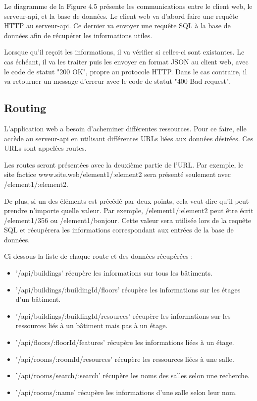 \documentclass[
    iai, %
    il, %
]{heig-tb}
\begin{document}
Le diagramme de la Figure 4.5 présente les communications entre le client web,
le serveur-api, et la base de données. Le client web va d'abord faire une requête HTTP au serveur-api.
Ce dernier va envoyer une requête SQL à la base de données afin de récupérer les informations utiles.

Lorsque qu'il reçoit les informations, il va vérifier si celles-ci sont existantes.
Le cas échéant, il va les traiter puis les envoyer en format JSON au client web, avec le code de statut "200 OK", propre au protocole HTTP.
Dans le cas contraire, il va retourner un message d'erreur avec le code de statut "400 Bad request".

\subsection{Routing}

L'application web a besoin d'acheminer différentes ressources. Pour ce faire, elle accède au serveur-api en utilisant différentes URLs liées aux données désirées.
Ces URLs sont appelées routes.

Les routes seront présentées avec la deuxième partie de l'URL.
Par exemple, le site factice www.site.web/element1/:element2 sera présenté seulement avec /element1/:element2.

De plus, si un des éléments est précédé par deux points, cela veut dire qu'il peut prendre n'importe quelle valeur.
Par exemple, /element1/:element2 peut être écrit /element1/356 ou /element1/bonjour.
Cette valeur sera utilisée lors de la requête SQL et récupérera les informations correspondant aux entrées de la base de données.

Ci-dessous la liste de chaque route et des données récupérées :

\begin{itemize}
    \item '/api/buildings' récupère les informations sur tous les bâtiments.
    \item '/api/buildings/:buildingId/floors' récupère les informations sur les étages d'un bâtiment.
    \item '/api/buildings/:buildingId/resources' récupère les informations sur les ressources liés à un bâtiment mais pas à un étage.
    \item '/api/floors/:floorId/features' récupère les informations liées à un étage.
    \item '/api/rooms/:roomId/resources' récupère les ressources liées à une salle.
    \item '/api/rooms/search/:search' récupère les noms des salles selon une recherche.
    \item '/api/rooms/:name' récupère les informations d'une salle selon leur nom.
\end{itemize}
\end{document}
